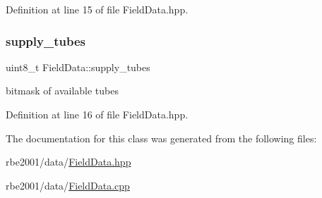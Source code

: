 Definition at line 15 of file Field\+Data.\+hpp.

\mbox{\label{class_field_data_a2ac91dcec791870370d578c276993690}} 
\subsubsection{\texorpdfstring{supply\+\_\+tubes}{supply\_tubes}}
{\footnotesize\ttfamily uint8\+\_\+t Field\+Data\+::supply\+\_\+tubes\hspace{0.3cm}{\ttfamily [private]}}



bitmask of available tubes 



Definition at line 16 of file Field\+Data.\+hpp.



The documentation for this class was generated from the following files\+:\begin{DoxyCompactItemize}
\item 
rbe2001/data/\hyperlink{_field_data_8hpp}{Field\+Data.\+hpp}\item 
rbe2001/data/\hyperlink{_field_data_8cpp}{Field\+Data.\+cpp}\end{DoxyCompactItemize}
